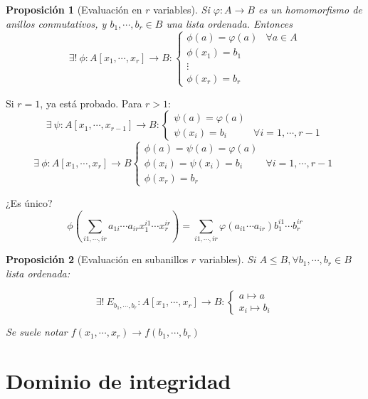 \documentclass[11pt, a4paper, titlepage]{article}
\makeatletter
\newif\IfInSansMode
\let\oldsf\sffamily
\renewcommand*{\sffamily}{\oldsf\mathversion{sans}\InSansModetrue}
\let\oldnorm\normalfont
\renewcommand*{\normalfont}{\oldnorm\InSansModefalse\mathversion{normal}}
\renewenvironment{proof}[1][\proofname] {\vspace{-15pt}\par\pushQED{\qed}\normalfont\topsep6\p@\@plus6\p@\relax\trivlist\item[\hskip\labelsep\it#1\@addpunct{.}]\ignorespaces}{\popQED\endtrivlist\@endpefalse}
\renewenvironment{proof}[1][\proofname] {\par\pushQED{\qed}\normalfont\topsep6\p@\@plus6\p@\relax\trivlist\item[\hskip\labelsep\itshape\sffamily#1\@addpunct{.}]\ignorespaces}{\popQED\endtrivlist\@endpefalse}
\theoremstyle{theorem-style}
\newtheorem{nprop}{Proposición}[section]
\theoremstyle{definition-style}
\theoremstyle{remark-style}
\theoremstyle{example-style}
\makeatother
\begin{document}
\begin{nprop}[Evaluación en $r$ variables]
  Si $\varphi : A \longrightarrow B$ es un homomorfismo de anillos conmutativos, y $b_1,\cdots, b_r \in B$ una lista ordenada. Entonces
  \[
    \exists!\ \phi : A[x_1,\cdots,x_r] \longrightarrow B :\begin{cases}
      \phi(a) = \varphi(a) & \forall a\in A\\
      \phi(x_1) = b_1\\
      \vdots\\
      \phi(x_r) = b_r
    \end{cases}
  \]
\end{nprop}

\begin{proof}
  Si $r=1$, ya está probado. Para $r>1$:
  \[
    \exists\ \psi : A[x_1,\cdots,x_{r-1}] \longrightarrow B : \begin{cases}
      \psi(a) = \varphi(a)\\
      \psi(x_i) = b_i & \forall i=1,\cdots,r-1
    \end{cases}
  \]
  \[  \exists\ \phi : A[x_1,\cdots,x_r] \longrightarrow B \begin{cases}
      \phi(a) = \psi(a) = \varphi(a)\\
      \phi(x_i) = \psi(x_i) = b_i &\forall i=1,\cdots,r-1\\
      \phi(x_r) = b_r
    \end{cases}
  \]

  ¿Es único?
  \[
    \phi\left(\sum_{i1,\cdots,ir} a_{1i}\cdots a_{ir}x_1^{i1}\cdots x_r^{ir} \right)= \sum _{i1,\cdots,ir} \varphi(a_{i1}\cdots a_{ir})b_1^{i1}\cdots b_r^{ir}
  \]
\end{proof}

\begin{nprop}[Evaluación en subanillos $r$ variables]
	Si $A\leq B, \forall b_1,\cdots,b_r \in B$ lista ordenada:

\[
\exists !\ E_{b_1,\cdots,b_r}: A[x_1,\cdots,x_r] \to B :
\begin{cases}
	a \mapsto a\\
	x_i \mapsto b_i
\end{cases}
\]

Se suele notar $f(x_1,\cdots,x_r) \to f(b_1,\cdots,b_r)$
\end{nprop}

\section{Dominio de integridad}
\end{document}
